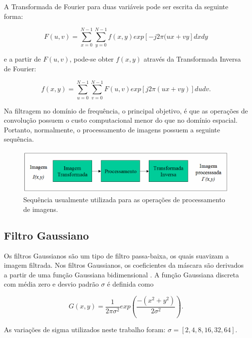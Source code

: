 \documentclass[twoside,twocolumn]{article}
\begin{document}
A Transformada de Fourier para duas variáveis pode ser escrita da seguinte forma:

\begin{equation*}
	F(u,v) = \sum_{x = 0}^{N - 1} \sum_{y = 0}^{N - 1} f(x,y)exp\left[-j2\pi(ux + vy\right] dx dy
\end{equation*}

e a partir de $F(u,v)$, pode-se obter $f(x,y)$ através da Transformada Inversa de Fourier:

\begin{equation*}
	f(x,y) =  \sum_{u = 0}^{N - 1} \sum_{v = 0}^{N - 1} F(u,v)exp\left[j2\pi(ux + vy)\right] du dv.
\end{equation*}

Na filtragem no domínio de frequência, o principal objetivo, é que as operações de convolução possuem o custo computacional menor do que no domínio espacial. Portanto, normalmente, o processamento de imagens possuem a seguinte sequência.

\begin{figure}[H]
\begin{center}
	\includegraphics[scale=.35]{figures/sequencia_fourier.png}
\caption{Sequência usualmente utilizada para as operações de processamento de imagens.} \label{gdimotes}
\end{center}
\end{figure}

\subsection{Filtro Gaussiano}

Os filtros Gaussianos são um tipo de filtro passa-baixa, os quais suavizam a imagem filtrada. Nos filtros Gaussianos, os coeficientes da máscara são derivados a partir de uma função Gaussiana bidimensional \cite{b2}. A função Gaussiana discreta com média zero e desvio padrão $\sigma$ é definida como

\begin{equation*}
	G(x,y) = \dfrac{1}{2\pi\sigma^{2}}exp\left(\dfrac{-(x^{2} + y^{2})}{2\sigma^{2}}\right).
\end{equation*}

As variações de sigma utilizados neste trabalho foram: $\sigma = \left[2,4,8,16,32,64\right]$.
\end{document}
